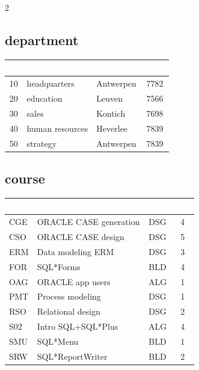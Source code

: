 \documentclass[10pt,a4paper]{article}
\newcommand{\TBLH}[1]{\textbf{\textcolor{white}{#1}}}
\begin{document}
\begin{multicols}{2}
\subsection{department}

{\scriptsize
\begin{tabular}{|c|l|l|c|}
\hline
\rowcolor{tblhead}\TBLH{nr} & \TBLH{name} & \TBLH{location} & \TBLH{head} \\ \hline
10 & headquarters    & Antwerpen & 7782 \\ \hline
\rowcolor{rowalt}
20 & education       & Leuven    & 7566 \\ \hline
30 & sales           & Kontich   & 7698 \\ \hline
\rowcolor{rowalt}
40 & human resources & Heverlee  & 7839 \\ \hline
50 & strategy        & Antwerpen & 7839 \\ \hline
\end{tabular}}

\columnbreak

\subsection{course}

{\scriptsize
\begin{tabular}{|l|l|c|c|}
\hline
\rowcolor{tblhead}\TBLH{code} & \TBLH{description (kort)} & \TBLH{type} & \TBLH{dur} \\ \hline
CGE & ORACLE CASE generation  & DSG & 4 \\ \hline
\rowcolor{rowalt}
CSO & ORACLE CASE design       & DSG & 5 \\ \hline
ERM & Data modeling ERM        & DSG & 3 \\ \hline
\rowcolor{rowalt}
FOR & SQL*Forms                & BLD & 4 \\ \hline
OAG & ORACLE app users         & ALG & 1 \\ \hline
\rowcolor{rowalt}
PMT & Process modeling         & DSG & 1 \\ \hline
RSO & Relational design        & DSG & 2 \\ \hline
\rowcolor{rowalt}
S02 & Intro SQL+SQL*Plus       & ALG & 4 \\ \hline
SMU & SQL*Menu                 & BLD & 1 \\ \hline
\rowcolor{rowalt}
SRW & SQL*ReportWriter         & BLD & 2 \\ \hline
\end{tabular}}
\end{multicols}
\end{document}
